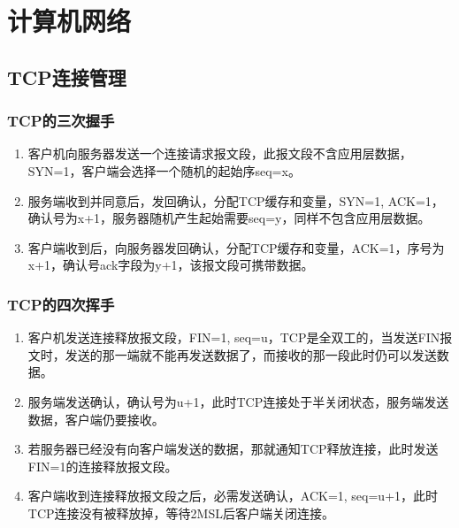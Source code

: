 \documentclass[chapter.computer_science.tex]{subfiles}
\begin{document}
\section{计算机网络}
\subsection{TCP连接管理}
\subsubsection{TCP的三次握手}
\begin{enumerate}
    \item 客户机向服务器发送一个连接请求报文段，此报文段不含应用层数据，SYN=1，客户端会选择一个随机的起始序seq=x。
    \item 服务端收到并同意后，发回确认，分配TCP缓存和变量，SYN=1, ACK=1，确认号为x+1，服务器随机产生起始需要seq=y，同样不包含应用层数据。
    \item 客户端收到后，向服务器发回确认，分配TCP缓存和变量，ACK=1，序号为x+1，确认号ack字段为y+1，该报文段可携带数据。
\end{enumerate}
\subsubsection{TCP的四次挥手}
\begin{enumerate}
    \item 客户机发送连接释放报文段，FIN=1, seq=u，TCP是全双工的，当发送FIN报文时，发送的那一端就不能再发送数据了，而接收的那一段此时仍可以发送数据。
    \item 服务端发送确认，确认号为u+1，此时TCP连接处于半关闭状态，服务端发送数据，客户端仍要接收。
    \item 若服务器已经没有向客户端发送的数据，那就通知TCP释放连接，此时发送FIN=1的连接释放报文段。
    \item 客户端收到连接释放报文段之后，必需发送确认，ACK=1, seq=u+1，此时TCP连接没有被释放掉，等待2MSL后客户端关闭连接。
\end{enumerate}
\end{document}
